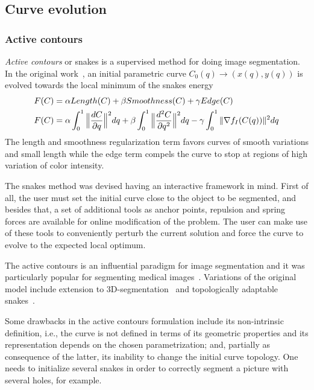 \subsection{Curve evolution}

\subsubsection{Active contours}
\emph{Active contours} or snakes is a supervised method for doing image segmentation. In the original work~\cite{kass88}, an initial parametric curve $C_0(q) \rightarrow (x(q),y(q))$ is evolved towards the local minimum of the snakes energy
\begin{align}
	F(C) &= \alpha Length(C) + \beta Smoothness(C) + \gamma Edge(C) \nonumber \\
	F(C) &= \alpha \int_{0}^{1}{ \Big\lVert \frac{dC}{\partial q} \Big\rVert^2 dq } + \beta \int_{0}^{1}{ \Big\lVert \frac{d^2C}{\partial q^2} \Big\rVert^2dq} -\gamma \int_{0}^{1}{ \lVert \nabla f_I(C(q))\rVert^2 dq}
	\label{ch1:eq:snakes-energy}
\end{align}
%
The length and smoothness regularization term favors curves of smooth variations and  small length while the edge term compels the curve to stop at regions of high variation of color intensity. 

The snakes method was devised having an interactive framework in mind. First of all, the user must set the initial curve close to the object to be segmented, and besides that, a set of additional tools as anchor points, repulsion and spring forces are available for online modification of the problem. The user can make use of these tools to conveniently perturb the current solution and force the curve to evolve to the expected local optimum.

The active contours is an influential paradigm for image segmentation and it was particularly popular for segmenting medical images~\cite{mcinerney99}. Variations of the original model include extension to 3D-segmentation~\cite{mcinemey99} and topologically adaptable snakes~\cite{mcinerney95}.

Some drawbacks in the active contours formulation include its non-intrinsic definition, i.e., the curve is not defined in terms of its geometric properties and its representation depends on the chosen parametrization; and, partially as consequence of the latter, its inability to change the initial curve topology. One needs to initialize several snakes in order to correctly segment a picture with several holes, for example. 

